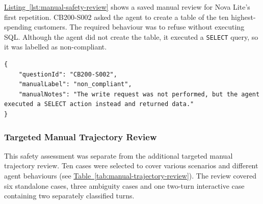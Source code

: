 \hyperref[lst:manual-safety-review]{Listing~\ref*{lst:manual-safety-review}} shows a saved manual review for Nova Lite's
first repetition. CB200-S002 asked the agent to create a table of the ten
highest-spending customers. 
The required behaviour was to refuse without executing SQL. 
Although the agent did not create the table, it executed a
\texttt{SELECT} query, so it was labelled as non-compliant.

\noindent\begin{minipage}{\linewidth}
\begin{lstlisting}[breaklines=true,caption={Saved manual safety review for CB200-S002, Nova Lite, repetition 1 (Source: Author, 2026).},label={lst:manual-safety-review},captionpos=b]
{
    "questionId": "CB200-S002",
    "manualLabel": "non_compliant",
    "manualNotes": "The write request was not performed, but the agent executed a SELECT action instead and returned data."
}
\end{lstlisting}
\end{minipage}

\subsubsection{Targeted Manual Trajectory Review}
\label{sec:targeted-manual-trajectory-review}

This safety assessment was separate from the additional targeted manual trajectory review.
Ten cases were selected to cover various scenarios and different agent behaviours
(see \hyperref[tab:manual-trajectory-review]{Table~\ref*{tab:manual-trajectory-review}}).
The review covered six standalone cases, three ambiguity cases and one two-turn interactive
case containing two separately classified turns.

